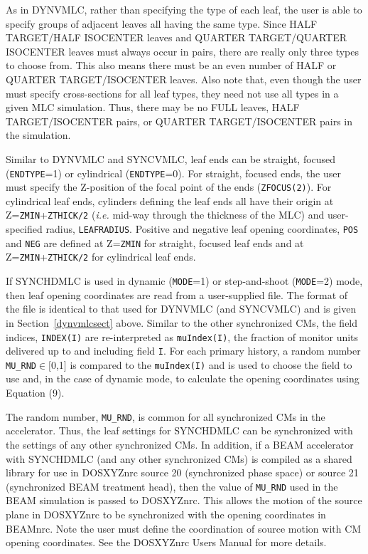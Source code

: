 \documentclass[12pt,twoside]{article}
\begin{document}
As in DYNVMLC, rather than specifying the type of each leaf, the user is able to specify groups
of adjacent leaves all having the same type.  Since HALF TARGET/HALF ISOCENTER leaves and
QUARTER TARGET/QUARTER ISOCENTER leaves must always occur in pairs, there are really
only three types to choose from.  This also means there must be an even number of
HALF or QUARTER TARGET/ISOCENTER leaves.  Also note that, even though the user
must specify cross-sections for all leaf types, they need not use all types in a
given MLC simulation.  Thus, there may be no FULL leaves, HALF TARGET/ISOCENTER
pairs, or QUARTER TARGET/ISOCENTER pairs in the simulation.

Similar to DYNVMLC and SYNCVMLC, leaf ends can be straight, focused ({\tt ENDTYPE}=1) or cylindrical
({\tt ENDTYPE}=0).  For straight, focused ends, the user must specify the Z-position of the
focal point of the ends ({\tt ZFOCUS(2)}).  For cylindrical leaf ends, cylinders defining the leaf
ends all have their origin at Z={\tt ZMIN}+{\tt ZTHICK/2} ({\it i.e.} mid-way through the thickness
of the MLC) and user-specified radius, {\tt LEAFRADIUS}.  Positive and negative leaf opening coordinates, {\tt POS} and {\tt NEG}
are defined at Z={\tt ZMIN} for straight, focused leaf ends and at Z={\tt ZMIN}+{\tt ZTHICK/2} for cylindrical
leaf ends.

If SYNCHDMLC is used in dynamic ({\tt MODE}=1) or step-and-shoot ({\tt MODE}=2) mode, then
leaf opening coordinates are read from a user-supplied file.  The format of the file
is identical to that used for DYNVMLC (and SYNCVMLC) and is given in
Section~\ref{dynvmlcsect} above.  Similar to the other synchronized CMs, the field indices,
{\tt INDEX(I)} are re-interpreted as {\tt muIndex(I)}, the fraction of monitor units delivered
up to and including field {\tt I}.  For each primary history, a random number {\tt MU\_RND}$\in[$0,1$]$ is
compared to the {\tt muIndex(I)} and is used to choose the field to use and,
in the case of dynamic mode, to calculate the opening coordinates using Equation (9).

The random number, {\tt MU\_RND}, is common for all synchronized CMs in the accelerator.  Thus, the
leaf settings for SYNCHDMLC can be synchronized with the settings of any other synchronized CMs.  In addition,
if a BEAM accelerator with SYNCHDMLC (and any other synchronized CMs) is compiled as a shared library for use
in DOSXYZnrc source 20 (synchronized phase space) or source 21 (synchronized BEAM treatment head), then
the value of {\tt MU\_RND} used in the BEAM simulation is passed to DOSXYZnrc.  This allows the motion of the source
plane in DOSXYZnrc to be synchronized with the opening coordinates in BEAMnrc.  Note the user must
define the coordination of source motion with CM opening coordinates.  See the DOSXYZnrc Users Manual\cite{Wa05}
for more details.
\end{document}
